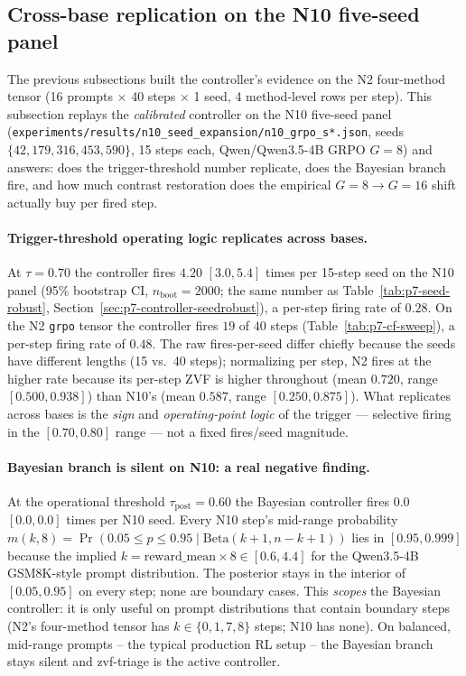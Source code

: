 \subsection{Cross-base replication on the N10 five-seed panel}
\label{sec:p7-controller-n10repl}
The previous subsections built the controller's evidence on the N2
four-method tensor (16 prompts $\times$ 40 steps $\times$ 1 seed,
4 method-level rows per step). This subsection replays the
\emph{calibrated} controller on the N10 five-seed panel
(\texttt{experiments/results/n10\_seed\_expansion/n10\_grpo\_s*.json},
seeds $\{42, 179, 316, 453, 590\}$, 15 steps each, Qwen/Qwen3.5-4B
GRPO $G{=}8$) and answers: does the trigger-threshold number
replicate, does the Bayesian branch fire, and how much contrast
restoration does the empirical $G{=}8 \to G{=}16$ shift actually
buy per fired step.

\paragraph{Trigger-threshold operating logic replicates across bases.}
At $\tau{=}0.70$ the controller fires $4.20$ $[3.0, 5.4]$ times
per 15-step seed on the N10 panel (95\% bootstrap CI, $n_{\text{boot}}{=}2000$;
the same number as Table~\ref{tab:p7-seed-robust},
Section~\ref{sec:p7-controller-seedrobust}), a per-step firing rate
of $0.28$. On the N2 \texttt{grpo} tensor the controller fires $19$
of $40$ steps (Table~\ref{tab:p7-cf-sweep}), a per-step firing rate
of $0.48$. The raw fires-per-seed differ chiefly because the seeds
have different lengths (15 vs.\ 40 steps); normalizing per step, N2
fires at the higher rate because its per-step ZVF is higher
throughout (mean $0.720$, range $[0.500, 0.938]$) than N10's
(mean $0.587$, range $[0.250, 0.875]$). What replicates across
bases is the \emph{sign} and \emph{operating-point logic} of the
trigger --- selective firing in the $[0.70, 0.80]$ range --- not a
fixed fires/seed magnitude.

\paragraph{Bayesian branch is silent on N10: a real negative finding.}
At the operational threshold $\tau_{\text{post}}{=}0.60$ the
Bayesian controller fires $0.0$ $[0.0, 0.0]$ times per N10 seed.
Every N10 step's mid-range probability
$m(k, 8) = \Pr(0.05 \le p \le 0.95 \mid \mathrm{Beta}(k{+}1, n{-}k{+}1))$
lies in $[0.95, 0.999]$ because the implied $k = \mathrm{reward\_mean}
\times 8 \in [0.6, 4.4]$ for the Qwen3.5-4B GSM8K-style prompt
distribution. The posterior stays in the interior of $[0.05, 0.95]$
on every step; none are boundary cases. This \emph{scopes} the
Bayesian controller: it is only useful on prompt distributions that
contain boundary steps (N2's four-method tensor has $k \in \{0, 1,
7, 8\}$ steps; N10 has none). On balanced, mid-range prompts --
the typical production RL setup -- the Bayesian branch stays
silent and zvf-triage is the active controller.

